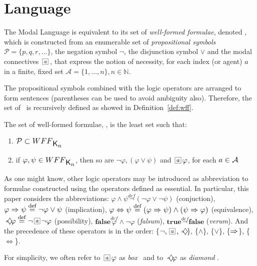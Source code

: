\section{Language}
\label{sec:language}

The Modal Language  is equivalent to its set of \emph{well-formed
formulae}, denoted \wff, which is constructed from an enumerable set of
\emph{propositional symbols} $\mathcal{P} = \{p, q, r, \ldots\}$, the negation
symbol $\neg$, the disjunction symbol $\lor$ and the modal connectives
$\nec{a}$, that express the notion of necessity, for each index (or agent) $a$
in a finite, fixed set $\mathcal{A} = \{1, \ldots, n\}, n \in \mathbb{N}$.

The propositional symbols combined with the logic operators are arranged to form
sentences (parentheses can be used to avoid ambiguity also). Therefore, the set
of \wff~is recursively defined as showed in Definition~\ref{def:wff}.

\begin{definition}
\label{def:wff}
    The set of well-formed formulae, \wff, is the least set such that:
    \begin{enumerate}
        \item $\mathcal{P} \subset \wff$
            \vspace{.2ex}
        \item if $\varphi, \psi \in \wff$, then so are $\neg \varphi, (\varphi
            \lor \psi)$ and $\nec{a} \varphi$, for each $a \in \Agents$
    \end{enumerate}
\end{definition}

As one might know, other logic operators may be introduced as abbreviation to
formulae constructed using the operators defined as essential. In particular,
this paper considers the abbreviations:
$\varphi \wedge \psi \stackrel{def} \neg(\neg \varphi \lor \neg \psi)$
(conjuction),
$\varphi \then \psi \stackrel{def} \neg \varphi \lor \psi$ (implication),
$\varphi \iff \psi \stackrel{def} (\varphi \then \psi) \land (\psi \then
\varphi)$ (equivalence),
$\pos{a} \varphi \stackrel{def} \neg \nec{a} \neg \varphi$ (possibility),
$\textbf{false} \stackrel{def} \varphi \wedge \neg \varphi$ (\emph{falsum}),
$ \textbf{true} \stackrel{def} \neg \textbf{false}$ (\emph{verum}).
And the precedence of these operators is in the order: 
\{$\neg, \nec{a}, \pos{a}$\},
\{$\wedge$\},
\{$\lor$\},
\{$\then$\},
\{$\iff$\}.

For simplicity, we often refer to $\nec{a} \formula$ as \emph{box} \formula~and to
$\pos{a} \formula$ as \emph{diamond} \formula.

